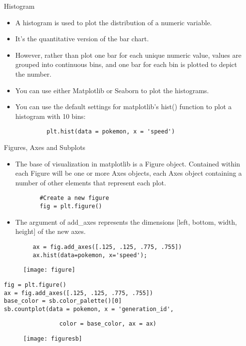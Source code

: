 \documentclass[12pt]{beamer}
\begin{document}
    \begin{frame}[fragile]{Histogram}
    	\begin{itemize}
    		\item A histogram is used to plot the distribution of a numeric variable.
    		\item It's the quantitative version of the bar chart.
    		\item However, rather than plot one bar for each unique numeric value, values are grouped into continuous bins, and one bar for each bin is plotted to depict the number.
    		\item You can use either Matplotlib or Seaborn to plot the histograms. 
    		\item You can use the default settings for matplotlib's hist() function to plot a histogram with 10 bins:
    		\begin{verbatim}
         plt.hist(data = pokemon, x = 'speed')
    		\end{verbatim}
    		
    		
    	\end{itemize}
    \end{frame}
    \begin{frame}[fragile]{Figures, Axes and Subplots}
    	\begin{itemize}
    		\item The base of visualization in matplotlib is a Figure object. Contained within each Figure will be one or more Axes objects, each Axes object containing a number of other elements that represent each plot.
    		\begin{verbatim}
       #Create a new figure
       fig = plt.figure()
    		\end{verbatim}
    	\item The argument of add\_axes represents the dimensions [left, bottom, width, height] of the new axes. 
    	\begin{verbatim}
     ax = fig.add_axes([.125, .125, .775, .755])
     ax.hist(data=pokemon, x='speed');
    	\end{verbatim}
    	\end{itemize}
    \end{frame}
    \begin{frame}{}
    	\begin{figure}
    		\centering
    		\texttt{[image: figure]}
    	\end{figure}
    \end{frame}
    \begin{frame}[fragile]{}
    	\begin{verbatim}
fig = plt.figure()
ax = fig.add_axes([.125, .125, .775, .755])
base_color = sb.color_palette()[0]
sb.countplot(data = pokemon, x = 'generation_id', 
    	\end{verbatim}
    \begin{verbatim}
                color = base_color, ax = ax)
    \end{verbatim}
    
    	\begin{figure}
    		\centering
    		\texttt{[image: figuresb]}
    	\end{figure}
    \end{frame}
\end{document}
